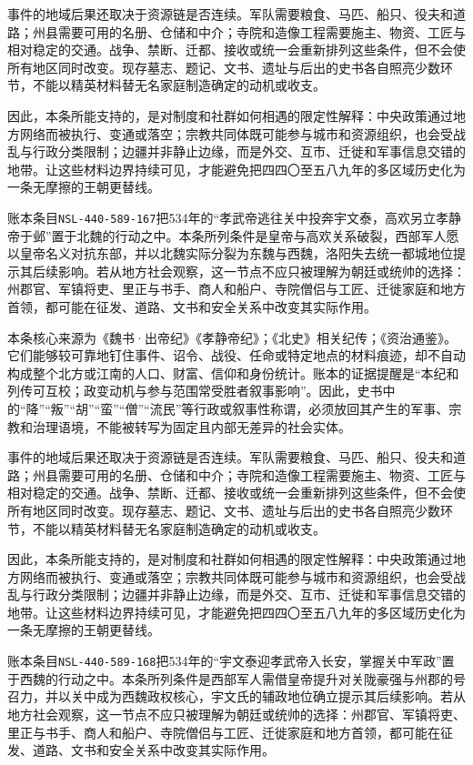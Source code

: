 事件的地域后果还取决于资源链是否连续。军队需要粮食、马匹、船只、役夫和道路；州县需要可用的名册、仓储和中介；寺院和造像工程需要施主、物资、工匠与相对稳定的交通。战争、禁断、迁都、接收或统一会重新排列这些条件，但不会使所有地区同时改变。现存墓志、题记、文书、遗址与后出的史书各自照亮少数环节，不能以精英材料替无名家庭制造确定的动机或收支。

因此，本条所能支持的，是对制度和社群如何相遇的限定性解释：中央政策通过地方网络而被执行、变通或落空；宗教共同体既可能参与城市和资源组织，也会受战乱与行政分类限制；边疆并非静止边缘，而是外交、互市、迁徙和军事信息交错的地带。让这些材料边界持续可见，才能避免把四四〇至五八九年的多区域历史化为一条无摩擦的王朝更替线。

账本条目\texttt{NSL-440-589-167}把534年的“孝武帝逃往关中投奔宇文泰，高欢另立孝静帝于邺”置于北魏的行动之中。本条所列条件是皇帝与高欢关系破裂，西部军人愿以皇帝名义对抗东部，并以北魏实际分裂为东魏与西魏，洛阳失去统一都城地位提示其后续影响。若从地方社会观察，这一节点不应只被理解为朝廷或统帅的选择：州郡官、军镇将吏、里正与书手、商人和船户、寺院僧侣与工匠、迁徙家庭和地方首领，都可能在征发、道路、文书和安全关系中改变其实际作用。

本条核心来源为《魏书·出帝纪》《孝静帝纪》；《北史》相关纪传；《资治通鉴》。它们能够较可靠地钉住事件、诏令、战役、任命或特定地点的材料痕迹，却不自动构成整个北方或江南的人口、财富、信仰和身份统计。账本的证据提醒是“本纪和列传可互校；政变动机与参与范围常受胜者叙事影响”。因此，史书中的“降”“叛”“胡”“蛮”“僧”“流民”等行政或叙事性称谓，必须放回其产生的军事、宗教和治理语境，不能被转写为固定且内部无差异的社会实体。

事件的地域后果还取决于资源链是否连续。军队需要粮食、马匹、船只、役夫和道路；州县需要可用的名册、仓储和中介；寺院和造像工程需要施主、物资、工匠与相对稳定的交通。战争、禁断、迁都、接收或统一会重新排列这些条件，但不会使所有地区同时改变。现存墓志、题记、文书、遗址与后出的史书各自照亮少数环节，不能以精英材料替无名家庭制造确定的动机或收支。

因此，本条所能支持的，是对制度和社群如何相遇的限定性解释：中央政策通过地方网络而被执行、变通或落空；宗教共同体既可能参与城市和资源组织，也会受战乱与行政分类限制；边疆并非静止边缘，而是外交、互市、迁徙和军事信息交错的地带。让这些材料边界持续可见，才能避免把四四〇至五八九年的多区域历史化为一条无摩擦的王朝更替线。

账本条目\texttt{NSL-440-589-168}把534年的“宇文泰迎孝武帝入长安，掌握关中军政”置于西魏的行动之中。本条所列条件是西部军人需借皇帝提升对关陇豪强与州郡的号召力，并以关中成为西魏政权核心，宇文氏的辅政地位确立提示其后续影响。若从地方社会观察，这一节点不应只被理解为朝廷或统帅的选择：州郡官、军镇将吏、里正与书手、商人和船户、寺院僧侣与工匠、迁徙家庭和地方首领，都可能在征发、道路、文书和安全关系中改变其实际作用。

